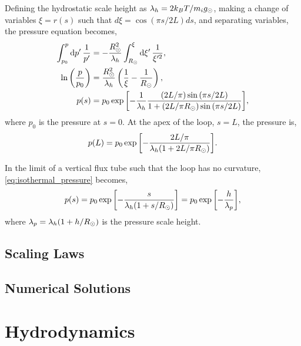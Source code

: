 Defining the hydrostatic scale height as $\lambda_h=2k_BT/m_ig_\odot$, making a change of variables $\xi=r(s)$ such that $d\xi=\cos{(\pi s / 2L)}ds$, and separating variables, the pressure equation becomes,
\begin{align}
    \int_{p_0}^p\textup{d}p^\prime\,\frac{1}{p^\prime} &= -\frac{R_\odot^2}{\lambda_h}\int_{R_\odot}^\xi\textup{d}\xi^\prime\,\frac{1}{\xi^{\prime2}},\nonumber \\
    \ln\left(\frac{p}{p_0}\right) &= \frac{R_\odot^2}{\lambda_h}\left(\frac{1}{\xi} - \frac{1}{R_\odot}\right),\nonumber \\
    p(s) &= p_0\exp{\left[-\frac{1}{\lambda_h}\frac{(2L/\pi)\sin{(\pi s/2L)}}{1 + (2L/\pi R_\odot)\sin{(\pi s/2L)}}\right]}, \label{eq:isothermal_pressure}
\end{align}
where $p_0$ is the pressure at $s=0$. At the apex of the loop, $s=L$, the pressure is,
\begin{equation*}
    p(L) = p_0\exp{\left[-\frac{2L/\pi}{\lambda_h(1 + 2L/\pi R_\odot)}\right]}.
\end{equation*}

In the limit of a vertical flux tube such that the loop has no curvature, \autoref{eq:isothermal_pressure} becomes,
\begin{equation*}
    p(s) = p_0\exp{\left[-\frac{s}{\lambda_h(1 + s/R_\odot)}\right]} = p_0\exp{\left[-\frac{h}{\lambda_p}\right]},
\end{equation*}
where $\lambda_p=\lambda_h(1 + h/R_\odot)$ is the pressure scale height. 

\subsection{Scaling Laws}\label{sec:scaling_laws}


\subsection{Numerical Solutions}\label{sec:hydrostatic_numerical}


\section{Hydrodynamics}\label{sec:hydrodynamics}



